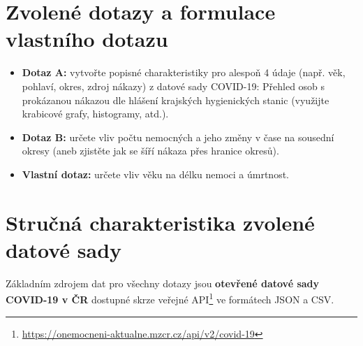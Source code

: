 \documentclass[11pt,a4paper,titlepage]{article}
\begin{document}
\section{Zvolené dotazy a formulace vlastního dotazu}
\begin{itemize}
    \setlength\itemsep{0.3em}
    \item \textbf{Dotaz A:} vytvořte popisné charakteristiky pro alespoň 4 údaje (např. věk, pohlaví, okres, zdroj nákazy) z datové sady COVID-19: Přehled osob s prokázanou nákazou dle hlášení krajských hygienických stanic (využijte krabicové grafy, histogramy, atd.).
    \item \textbf{Dotaz B:} určete vliv počtu nemocných a jeho změny v čase na sousední okresy (aneb zjistěte jak se šíří nákaza přes hranice okresů).
    \item \textbf{Vlastní dotaz:} určete vliv věku na délku nemoci a úmrtnost.
    
\end{itemize}

\section{Stručná charakteristika zvolené datové sady}

Základním zdrojem dat pro všechny dotazy jsou \textbf{otevřené datové sady COVID-19 v ČR}\cite{data_mzcr_covid_ofic} dostupné skrze veřejné API\footnote{\url{https://onemocneni-aktualne.mzcr.cz/api/v2/covid-19}} ve formátech JSON a CSV.
\end{document}
